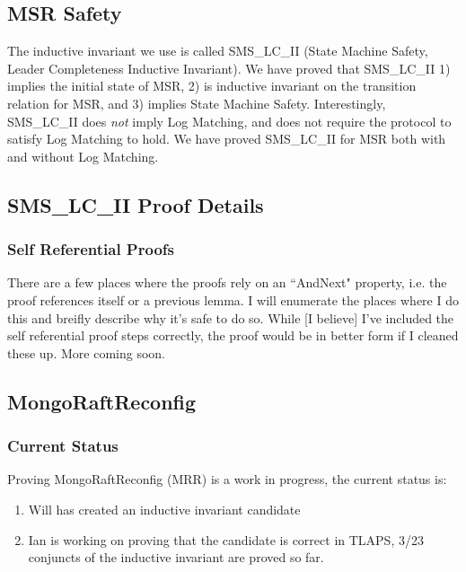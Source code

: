 \documentclass[12pt]{article}
\begin{document}
\subsection{MSR Safety}
The inductive invariant we use is called SMS\_LC\_II (State Machine Safety, Leader Completeness Inductive Invariant).  We have proved that SMS\_LC\_II 1) implies the initial state of MSR, 2) is inductive invariant on the transition relation for MSR, and 3) implies State Machine Safety.  Interestingly, SMS\_LC\_II does \textit{not} imply Log Matching, and does not require the protocol to satisfy Log Matching to hold.  We have proved SMS\_LC\_II for MSR both with and without Log Matching.  

\subsection{SMS\_LC\_II Proof Details}
\subsubsection{Self Referential Proofs}
There are a few places where the proofs rely on an ``AndNext" property, i.e. the proof references itself or a previous lemma.  I will enumerate the places where I do this and breifly describe why it's safe to do so.  While [I believe] I've included the self referential proof steps correctly, the proof would be in better form if I cleaned these up.  More coming soon.  

\subsection{MongoRaftReconfig}
\subsubsection{Current Status}
Proving MongoRaftReconfig (MRR) is a work in progress, the current status is:
\begin{enumerate}
	\item Will has created an inductive invariant candidate
	\item Ian is working on proving that the candidate is correct in TLAPS, 3/23 conjuncts of the inductive invariant are proved so far.  
\end{enumerate}
\end{document}
